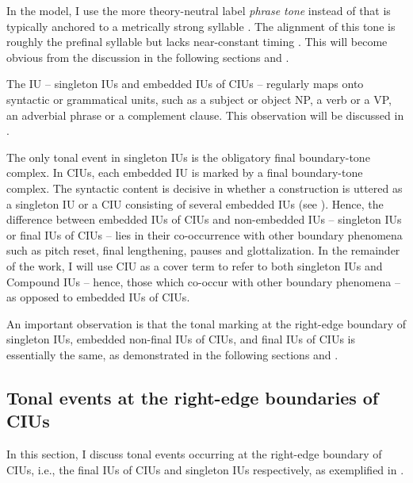 In the model, I use the more theory-neutral label \textit{phrase tone} instead of \textit{} that is typically anchored to a metrically strong syllable \citep{grice_ladd_arvaniti_2000}. The alignment of this tone is roughly the prefinal syllable but lacks near-constant timing  \citep[see][356]{Maskikit_Essed_2016}. This will become obvious from the  discussion in the following sections  and . 


The IU -- singleton IUs and embedded IUs of CIUs -- regularly maps onto syntactic or grammatical units, such as a subject or object NP, a verb or a VP, an adverbial phrase or a complement clause. This observation will be discussed in  .



The only tonal event in singleton IUs is the obligatory final boundary-tone complex. In CIUs, each embedded IU is marked by a final boundary-tone complex. The syntactic content is decisive in whether a construction is uttered as a singleton IU or a CIU consisting of several embedded IUs (see  ).  Hence, the difference between embedded IUs of CIUs and non-embedded IUs -- singleton IUs or final IUs of CIUs -- lies in their co-occurrence with other boundary phenomena such as pitch reset, final lengthening, pauses and glottalization. In the remainder of the work, I will use CIU as a cover term to refer to both singleton IUs and Compound IUs  -- hence, those which co-occur with other boundary phenomena -- as opposed to embedded IUs of CIUs. 



An important observation is that the tonal marking at the right-edge boundary of singleton IUs, embedded non-final IUs of CIUs, and final IUs of CIUs is essentially the same, as demonstrated in the following sections  and .






\subsection{Tonal events at the right-edge boundaries of CIUs}
\label{sec:tonal-events-at-the-boundaries-of-ius}

In this section, I discuss tonal events occurring at the right-edge boundary of CIUs, i.e., the final IUs of CIUs and singleton IUs respectively, as exemplified in .

